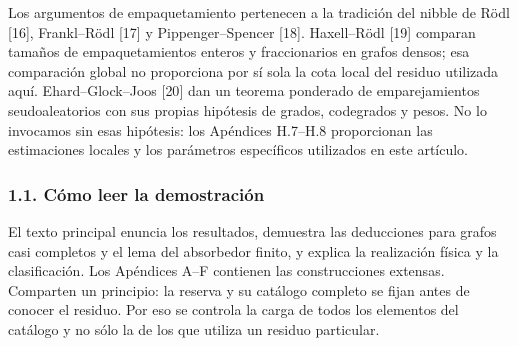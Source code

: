 \documentclass[spanish,11pt,a4paper]{article}
\begin{document}
Los argumentos de empaquetamiento pertenecen a la tradición del nibble de Rödl {[}16{]}, Frankl--Rödl {[}17{]} y Pippenger--Spencer {[}18{]}. Haxell--Rödl {[}19{]} comparan tamaños de empaquetamientos enteros y fraccionarios en grafos densos; esa comparación global no proporciona por sí sola la cota local del residuo utilizada aquí. Ehard--Glock--Joos {[}20{]} dan un teorema ponderado de emparejamientos seudoaleatorios con sus propias hipótesis de grados, codegrados y pesos. No lo invocamos sin esas hipótesis: los Apéndices H.7--H.8 proporcionan las estimaciones locales y los parámetros específicos utilizados en este artículo.

\subsubsection{1.1. Cómo leer la demostración}\label{cuxf3mo-leer-la-demostraciuxf3n}

El texto principal enuncia los resultados, demuestra las deducciones para grafos casi completos y el lema del absorbedor finito, y explica la realización física y la clasificación. Los Apéndices A--F contienen las construcciones extensas. Comparten un principio: la reserva y su catálogo completo se fijan antes de conocer el residuo. Por eso se controla la carga de todos los elementos del catálogo y no sólo la de los que utiliza un residuo particular.
\end{document}
